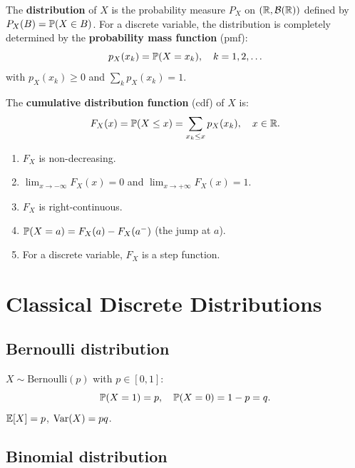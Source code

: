 \begin{definition}
The \textbf{distribution} of $X$ is the probability measure $P_X$ on
$(\mathbb{R}, \mathcal{B}(\mathbb{R}))$ defined by $P_X(B) = \mathbb{P}(X \in B)$. For a discrete
variable, the distribution is completely determined by the \textbf{probability
mass function} (pmf):
\[
    p_X(x_k) = \mathbb{P}(X = x_k), \quad k = 1, 2, \ldots
\]
with $p_X(x_k) \geq 0$ and $\sum_k p_X(x_k) = 1$.
\end{definition}

\begin{definition}
The \textbf{cumulative distribution function} (cdf) of $X$ is:
\[
    F_X(x) = \mathbb{P}(X \leq x) = \sum_{x_k \leq x} p_X(x_k), \quad x \in \mathbb{R}.
\]
\end{definition}

\begin{proposition}[Properties of $F_X$]
\begin{enumerate}[label=(\roman*)]
    \item $F_X$ is non-decreasing.
    \item $\lim_{x \to -\infty} F_X(x) = 0$ and $\lim_{x \to +\infty} F_X(x) = 1$.
    \item $F_X$ is right-continuous.
    \item $\mathbb{P}(X = a) = F_X(a) - F_X(a^-)$ (the jump at $a$).
    \item For a discrete variable, $F_X$ is a step function.
\end{enumerate}
\end{proposition}

\section{Classical Discrete Distributions}

\subsection{Bernoulli distribution}

\begin{definition}[Bernoulli]
$X \sim \mathrm{Bernoulli}(p)$ with $p \in [0,1]$:
\[
    \mathbb{P}(X = 1) = p, \quad \mathbb{P}(X = 0) = 1 - p = q.
\]
$\mathbb{E}[X] = p$, $\mathrm{Var}(X) = pq$.
\end{definition}

\subsection{Binomial distribution}


